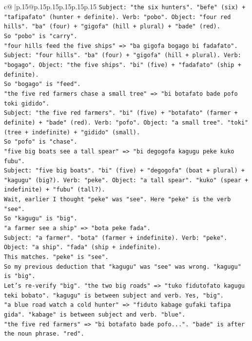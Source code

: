 \documentclass{article}
\begin{document}
{\begin{supertabular}{c@{$\;$}|p{.15\linewidth}@{}p{.15\linewidth}p{.15\linewidth}p{.15\linewidth}p{.15\linewidth}p{.15\linewidth}}
{{{\texttt{Subject: "the six hunters". "befe" (six) + "tafipafato" (hunter + definite). Verb: "pobo". Object: "four red hills". "ba" (four) + "gigofa" (hill + plural) + "bade" (red).} \\
\texttt{So "pobo" is "carry".} \\
\texttt{"four hills feed the five ships" => "ba gigofa bogago bi fadafato".} \\
\texttt{Subject: "four hills". "ba" (four) + "gigofa" (hill + plural). Verb: "bogago". Object: "the five ships". "bi" (five) + "fadafato" (ship + definite).} \\
\texttt{So "bogago" is "feed".} \\
\texttt{"the five red farmers chase a small tree" => "bi botafato bade pofo toki gidido".} \\
\texttt{Subject: "the five red farmers". "bi" (five) + "botafato" (farmer + definite) + "bade" (red). Verb: "pofo". Object: "a small tree". "toki" (tree + indefinite) + "gidido" (small).} \\
\texttt{So "pofo" is "chase".} \\
\texttt{"five big boats see a tall spear" => "bi degogofa kagugu peke kuko fubu".} \\
\texttt{Subject: "five big boats". "bi" (five) + "degogofa" (boat + plural) + "kagugu" (big?). Verb: "peke". Object: "a tall spear". "kuko" (spear + indefinite) + "fubu" (tall?).} \\
\texttt{Wait, earlier I thought "peke" was "see". Here "peke" is the verb "see".} \\
\texttt{So "kagugu" is "big".} \\
\texttt{"a farmer see a ship" => "bota peke fada".} \\
\texttt{Subject: "a farmer". "bota" (farmer + indefinite). Verb: "peke". Object: "a ship". "fada" (ship + indefinite).} \\
\texttt{This matches. "peke" is "see".} \\
\texttt{So my previous deduction that "kagugu" was "see" was wrong. "kagugu" is "big".} \\
\texttt{Let's re{-}verify "big". "the two big roads" => "tuko fidutofato kagugu teki bobato". "kagugu" is between subject and verb. Yes, "big".} \\
\texttt{"a blue road watch a cold hunter" => "fiduto kabage gufaki tafipa gida". "kabage" is between subject and verb. "blue".} \\
\texttt{"the five red farmers" => "bi botafato bade pofo...". "bade" is after the noun phrase. "red".} \\
}}}
\end{supertabular}}
\end{document}
